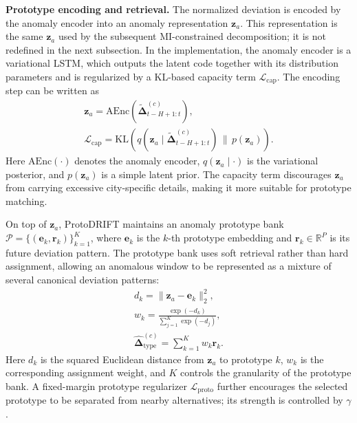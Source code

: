 \textbf{Prototype encoding and retrieval.} The normalized deviation is encoded by the anomaly encoder into an anomaly representation $\mathbf{z}_a$. This representation is the same $\mathbf{z}_a$ used by the subsequent MI-constrained decomposition; it is not redefined in the next subsection. In the implementation, the anomaly encoder is a variational LSTM, which outputs the latent code together with its distribution parameters and is regularized by a KL-based capacity term $\mathcal{L}_{\mathrm{cap}}$. The encoding step can be written as
\begin{equation}
\begin{gathered}
    \mathbf{z}_a=\mathrm{AEnc}\left(\widetilde{\boldsymbol{\Delta}}^{(c)}_{t-H+1:t}\right), \\
    \mathcal{L}_{\mathrm{cap}}=\mathrm{KL}\left(q(\mathbf{z}_a\mid\widetilde{\boldsymbol{\Delta}}^{(c)}_{t-H+1:t})\,\|\,p(\mathbf{z}_a)\right).
\end{gathered}
\end{equation}
Here $\mathrm{AEnc}(\cdot)$ denotes the anomaly encoder, $q(\mathbf{z}_a\mid\cdot)$ is the variational posterior, and $p(\mathbf{z}_a)$ is a simple latent prior. The capacity term discourages $\mathbf{z}_a$ from carrying excessive city-specific details, making it more suitable for prototype matching.

On top of $\mathbf{z}_a$, ProtoDRIFT maintains an anomaly prototype bank $\mathcal{P}=\{(\mathbf{e}_k,\mathbf{r}_k)\}_{k=1}^{K}$, where $\mathbf{e}_k$ is the $k$-th prototype embedding and $\mathbf{r}_k\in\mathbb{R}^{P}$ is its future deviation pattern. The prototype bank uses soft retrieval rather than hard assignment, allowing an anomalous window to be represented as a mixture of several canonical deviation patterns:
\begin{equation}
\begin{gathered}
    d_k=\|\mathbf{z}_a-\mathbf{e}_k\|_2^2, \\
    w_k=\frac{\exp(-d_k)}{\sum_{j=1}^{K}\exp(-d_j)}, \\
    \widehat{\boldsymbol{\Delta}}^{(c)}_{\mathrm{type}}=\sum_{k=1}^{K}w_k\mathbf{r}_k.
\end{gathered}
\end{equation}
Here $d_k$ is the squared Euclidean distance from $\mathbf{z}_a$ to prototype $k$, $w_k$ is the corresponding assignment weight, and $K$ controls the granularity of the prototype bank. A fixed-margin prototype regularizer $\mathcal{L}_{\mathrm{proto}}$ further encourages the selected prototype to be separated from nearby alternatives; its strength is controlled by $\gamma$.

